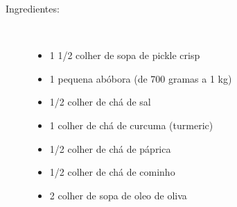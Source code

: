 \documentclass [11pt, papel de carta] {article}
\begin{document}
\begin {description}

\item [Ingredientes:] \ \\
\begin {itemize}
\item 1 1/2 colher de sopa de pickle crisp
\item 1 pequena abóbora (de 700 gramas a 1 kg)
\item 1/2 colher de chá de sal
\item 1 colher de chá de curcuma (turmeric)
\item 1/2 colher de chá de páprica
\item 1/2 colher de chá de cominho
\item 2 colher de sopa de oleo de oliva
\end {itemize}


\end{description}
\end{document}
